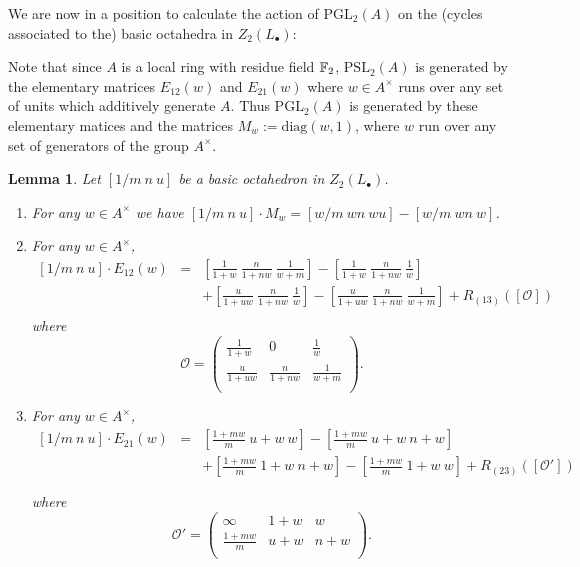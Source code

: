 \documentclass[12pt]{amsart}
\newtheorem{lem}{Lemma}[section]
\theoremstyle{definition}
\newcommand{\F}[1]{\Bbb{F}_{#1}}
\newcommand{\oct}{\mathcal{O}}%
\newcommand{\cyc}[1]{\left[ #1\right]} %
\newcommand{\scyc}[1]{\left[ #1 \right]} %
\newcommand{\pspl}[2]{\mathrm{PSL}_{#1}(#2)}
\newcommand{\pgl}[2]{\mathrm{PGL}_{#1}(#2)}
\newcommand{\<}{\langle}
\renewcommand{\>}{\rangle}
\begin{document}
We are now in a position to calculate the action of $\pgl{2}{A}$ on the (cycles associated to the) basic octahedra in $Z_2(L_\bullet)$:


Note that since $A$ is a local ring with residue field $\F{2}$, $\pspl{2}{A}$ is generated by the elementary matrices $E_{12}(w)$ and $E_{21}(w)$ where $w\in A^\times$ runs over any set of units which additively generate $A$. Thus $\pgl{2}{A}$ is generated by these elementary matices and the matrices $M_w:=\mathrm{diag}(w,1)$, where $w$ run over any set of generators of the group $A^\times$.
\begin{lem}\label{lem:action} Let $\scyc{ 1/m\  n\  u}$ be a basic octahedron in $Z_2(L_\bullet)$.

\begin{enumerate}
\item For any $w\in A^\times$ we have $\scyc{ 1/m\  n\ u}\cdot M_w=\scyc{w/m\ wn\ wu}-\scyc{ w/m\ wn\ w}$.
\item For any $w\in A^\times$, 
\begin{eqnarray*}
\scyc{ 1/m\  n\ u}\cdot E_{12}(w)&=& \scyc{\frac{1}{1+w}\ \frac{n}{1+nw}\ \frac{1}{w+m}}-\scyc{\frac{1}{1+w}\ \frac{n}{1+nw}\ \frac{1}{w}} \\
&&+\scyc{\frac{u}{1+uw}\ \frac{n}{1+nw}\ \frac{1}{w}}-\scyc{\frac{u}{1+uw}\ \frac{n}{1+nw}\ \frac{1}{w+m}}+R_{(13)}(\cyc{\oct})\\
\end{eqnarray*}
where 
\[
\oct=\left(
\begin{array}{lll}
\frac{1}{1+w}& 0&\frac{1}{w}\\
\frac{u}{1+uw}&\frac{n}{1+nw}&\frac{1}{w+m}\\
\end{array}
\right).
\]
\item For any $w\in A^\times$,
\begin{eqnarray*}
 \scyc{ 1/m\  n\ u}\cdot E_{21}(w)&=&    \scyc{\frac{1+mw}{m}\ u+w\ w}-\scyc{\frac{1+mw}{m}\ u+w\ n+w} \\
&&+\scyc{\frac{1+mw}{m}\ 1+w\ n+w}-\scyc{\frac{1+mw}{m}\ 1+w\ w}+R_{(23)}(\cyc{\oct'})\\    \\
\end{eqnarray*}
where 
\[
\oct'=\left(
\begin{array}{lll}
\infty& 1+w&{w}\\
\frac{1+mw}{m}&u+w&{n+w}\\
\end{array}
\right).
\]
\end{enumerate}
\end{lem}
\end{document}
